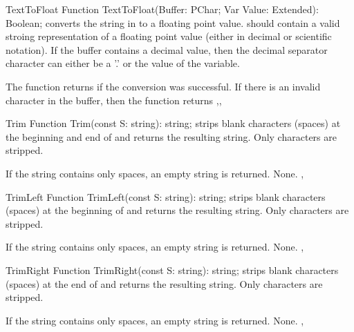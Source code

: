 
\begin{function}{TextToFloat}
\Declaration
Function TextToFloat(Buffer: PChar; Var Value: Extended): Boolean;
\Description
{} converts the string in  to a floating point 
value.  should contain a valid stroing representation of a 
floating point value (either in decimal or scientific notation). 
If the buffer contains a decimal value, then the decimal separator 
character can either be a '.' or the value of the  
variable.

The function returns  if the conversion was successful.
\Errors
If there is an invalid character in the buffer, then the function returns
\SeeAlso
{},, 
\end{function}


\begin{function}{Trim}
\Declaration
Function Trim(const S: string): string;
\Description
{} strips blank characters (spaces) at the beginning and end of 
and returns the resulting string. Only  characters are stripped.

If the string contains only spaces, an empty string is returned.
\Errors
None.
\SeeAlso
{}, 
\end{function}



\begin{function}{TrimLeft}
\Declaration
Function TrimLeft(const S: string): string;
\Description
{} strips blank characters (spaces) at the beginning of 
and returns the resulting string. Only  characters are stripped.

If the string contains only spaces, an empty string is returned.
\Errors
None.
\SeeAlso
{}, 
\end{function}



\begin{function}{TrimRight}
\Declaration
Function TrimRight(const S: string): string;
\Description
{} strips blank characters (spaces) at the end of 
and returns the resulting string. Only  characters are stripped.

If the string contains only spaces, an empty string is returned.
\Errors
None.
\SeeAlso
{}, 
\end{function}

